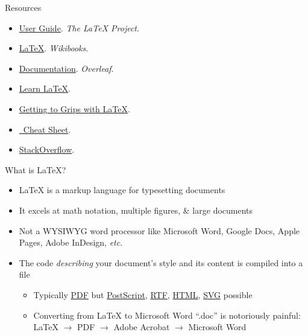 \documentclass{cubeamer}
\begin{document}
\begin{frame}{Resources}
    \begin{itemize}
        \item \href{https://www.latex-project.org/help/documentation/usrguide.pdf}{User Guide}. \textit{The \LaTeX{} Project}.
        \item \href{https://en.wikibooks.org/wiki/LaTeX}{\LaTeX}. \textit{Wikibooks}.
        \item \href{https://www.overleaf.com/learn}{Documentation}. \textit{Overleaf}.
        \item \href{https://www.learnlatex.org/en/}{Learn \LaTeX}.
        \item \href{https://www.andy-roberts.net/writing/latex}{Getting to Grips with \LaTeX}.
        \item \href{http://wch.github.io/latexsheet/latexsheet.pdf}{\LaTeXe~Cheat Sheet}.
        \item \href{https://tex.stackexchange.com/}{StackOverflow}.
    \end{itemize}
\end{frame}

\begin{frame}{What is \LaTeX?}
    \begin{itemize}
        \item \LaTeX{} is a markup language for typesetting documents
        \item It excels at math notation, multiple figures, \& large documents
        \item Not a WYSIWYG word processor like Microsoft Word, Google Docs, Apple Pages, Adobe InDesign, \textit{etc}.
        \item The code \textit{describing} your document's style and its content is compiled into a file
        \begin{itemize}
            \item Typically \href{https://en.wikipedia.org/wiki/PDF}{PDF} but \href{https://en.wikipedia.org/wiki/PostScript}{PostScript}, \href{https://en.wikipedia.org/wiki/Rich_Text_Format}{RTF}, \href{https://en.wikipedia.org/wiki/HTML}{HTML}, \href{https://en.wikipedia.org/wiki/Scalable_Vector_Graphics}{SVG} possible
            \item Converting from \LaTeX{} to Microsoft Word ``.doc'' is notoriously painful: \LaTeX{} $\rightarrow$ PDF $\rightarrow$ Adobe Acrobat $\rightarrow$ Microsoft Word
        \end{itemize}
    \end{itemize}
\end{frame}
\end{document}
